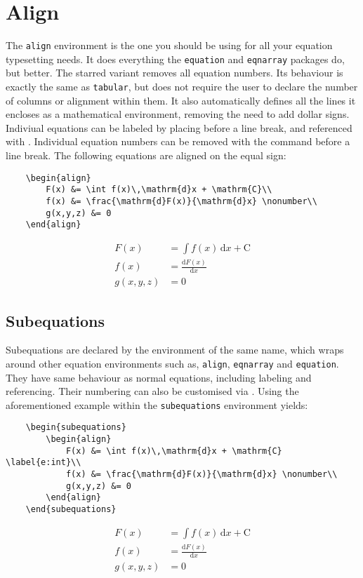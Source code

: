 \section{Align}
%
The \verb|align| environment is the one you should be using for all
your equation typesetting needs.  It does everything the
\verb|equation| and \verb|eqnarray| packages do, but better.  The
starred variant removes all equation numbers.  Its behaviour is
exactly the same as \verb|tabular|, but does not require the user to
declare the number of columns or alignment within them.  It also
automatically defines all the lines it encloses as a mathematical
environment, removing the need to add dollar signs.  Indiviual
equations can be labeled by placing  before a
line break, and referenced with .  Individual equation
numbers can be removed with the  command before a line
break.  The following equations are aligned on the equal sign:
\begin{verbatim}
	\begin{align}
	    F(x) &= \int f(x)\,\mathrm{d}x + \mathrm{C}\\
	    f(x) &= \frac{\mathrm{d}F(x)}{\mathrm{d}x} \nonumber\\
	    g(x,y,z) &= 0
	\end{align}
\end{verbatim}
\begin{align}
    F(x) &= \int f(x)\,\mathrm{d}x + \mathrm{C}\\
    f(x) &= \frac{\mathrm{d}F(x)}{\mathrm{d}x} \nonumber\\
    g(x,y,z) &= 0
\end{align}
%
\subsection{Subequations}
%
Subequations are declared by the environment of the same name, which
wraps around other equation environments such as, \verb|align|,
\verb|eqnarray| and \verb|equation|.  They have same behaviour as
normal equations, including labeling and referencing.  Their numbering
can also be customised via .  Using the
aforementioned example within the \verb|subequations| environment
yields:
\begin{verbatim}
	\begin{subequations}
	    \begin{align}
	        F(x) &= \int f(x)\,\mathrm{d}x + \mathrm{C} \label{e:int}\\
	        f(x) &= \frac{\mathrm{d}F(x)}{\mathrm{d}x} \nonumber\\
	        g(x,y,z) &= 0
	    \end{align}
	\end{subequations}
\end{verbatim}
\begin{subequations}
	\begin{align}
        F(x) &= \int f(x)\,\mathrm{d}x + \mathrm{C} \label{e:int}\\
        f(x) &= \frac{\mathrm{d}F(x)}{\mathrm{d}x} \nonumber\\
        g(x,y,z) &= 0
    \end{align}
\end{subequations}
%

